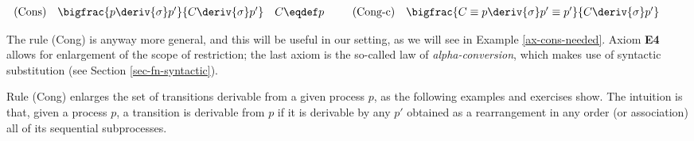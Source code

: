 $\begin{array}{lcllcl}
\mbox{(Cons)} & \bigfrac{p \deriv{\sigma}p'}{C\deriv{\sigma}p'}  & C\eqdef p & & \; \; 
\mbox{(Cong-c)}  & \bigfrac{C \equiv p\deriv{\sigma}p' \equiv p'}{C\deriv{\sigma}p'} \\
\end{array}$

The rule (Cong) is anyway more general, and this will be useful in our setting, as we will see in 
Example \ref{ax-cons-needed}.
Axiom {\bf E4} allows for enlargement of the scope of restriction;
the last axiom is the so-called law of {\em alpha-conversion}, which makes use of syntactic 
substitution (see Section \ref{sec-fn-syntactic}). 

Rule (Cong) enlarges the set of transitions derivable from a given process $p$, as the following 
examples and exercises show. The intuition is that, given a process $p$, a transition is derivable from $p$
if it is derivable by any $p'$ obtained as a rearrangement in any order (or association) all of its 
sequential subprocesses.

